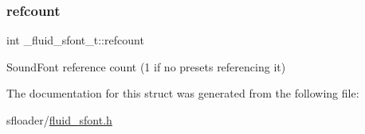\mbox{\label{struct__fluid__sfont__t_a71bae1b34460e3b0d6ed98fb072a73bd}} 
\subsubsection{\texorpdfstring{refcount}{refcount}}
{\footnotesize\ttfamily int \+\_\+fluid\+\_\+sfont\+\_\+t\+::refcount}

Sound\+Font reference count (1 if no presets referencing it) 

The documentation for this struct was generated from the following file\+:\begin{DoxyCompactItemize}
\item 
sfloader/\hyperlink{fluid__sfont_8h}{fluid\+\_\+sfont.\+h}\end{DoxyCompactItemize}
